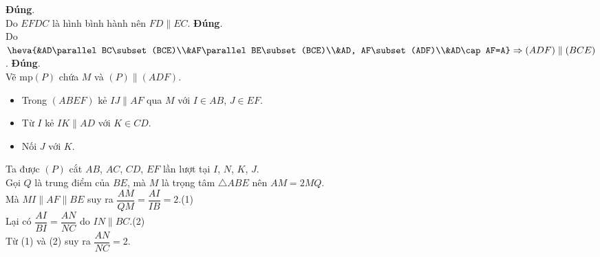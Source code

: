 \begin{ex}
{\begin{itemchoice}
			\itemch  \textbf{Đúng}.\\
			Do $EFDC$ là hình bình hành  nên $FD\parallel EC$.
			 \itemch \textbf{Đúng}.\\
			Do $\heva{&AD\parallel  BC\subset (BCE)\\&AF\parallel BE\subset (BCE)\\&AD, AF\subset(ADF)\\&AD\cap AF=A} \Rightarrow (ADF)\parallel(BCE)$.
			 \itemch \textbf{Đúng}.\\
			Vẽ mp$(P)$ chứa  $M$ và $(P)\parallel(ADF)$.
			\begin{itemize}
				\item Trong  $(ABEF)$ kẻ $IJ\parallel AF$ qua $M$ với $I\in AB$, $J\in EF$.
				\item Từ  $I$ kẻ $IK\parallel AD$ với $K\in CD$.
				\item Nối $J$ với  $K$.
			\end{itemize}
			Ta được $(P)$ cắt $AB$, $AC$, $CD$, $EF$ lần  lượt tại $I$, $N$, $K$, $J$.\\
			Gọi $Q$ là trung điểm  của $BE$, mà $M$ là trọng tâm $\triangle ABE$ nên $AM=2MQ$.\\
			Mà $MI\parallel AF\parallel BE$ suy ra $\dfrac{AM}{QM}=\dfrac{AI}{IB}=2$.\hfill(1)\\ 
			 Lại có $\dfrac{AI}{BI}=\dfrac{AN}{NC}$ do $IN\parallel BC$.\hfill(2)\\
			Từ (1) và (2) suy  ra $\dfrac{AN}{NC}=2$.
		\end{itemchoice}
	 }
\end{ex}


